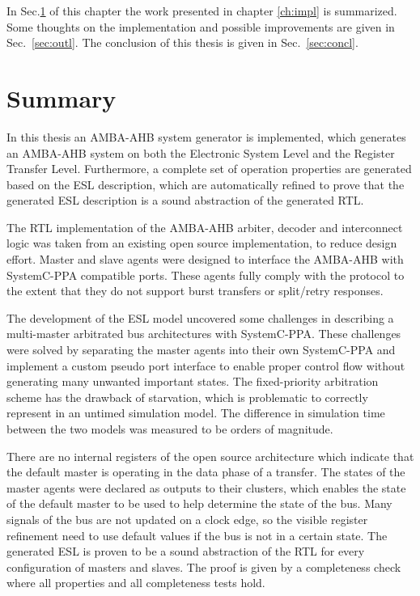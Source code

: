 In Sec.\ref{sec:sum} of this chapter the work presented in chapter \ref{ch:impl} is summarized. Some thoughts on the implementation and possible improvements are given in Sec.~\ref{sec:outl}. The conclusion of this thesis is given in Sec.~\ref{sec:concl}.

\section{Summary}
\label{sec:sum}
In this thesis an AMBA-AHB system generator is implemented, which generates an AMBA-AHB system on both the Electronic System Level and the Register Transfer Level. Furthermore, a complete set of operation properties are generated based on the ESL description, which are automatically refined to prove that the generated ESL description is a sound abstraction of the generated RTL. \par
The RTL implementation of the AMBA-AHB arbiter, decoder and interconnect logic was taken from an existing open source implementation, to reduce design effort. Master and slave agents were designed to interface the AMBA-AHB with SystemC-PPA compatible ports. These agents fully comply with the protocol to the extent that they do not support burst transfers or split/retry responses. \par
The development of the ESL model uncovered some challenges in describing a multi-master arbitrated bus architectures with SystemC-PPA. These challenges were solved by separating the master agents into their own SystemC-PPA and implement a custom pseudo port interface to enable proper control flow without generating many unwanted important states. The fixed-priority arbitration scheme has the drawback of starvation, which is problematic to correctly represent in an untimed simulation model. The difference in simulation time between the two models was measured to be orders of magnitude. \par
There are no internal registers of the open source architecture which indicate that the default master is operating in the data phase of a transfer. The states of the master agents were declared as outputs to their clusters, which enables the state of the default master to be used to help determine the state of the bus. Many signals of the bus are not updated on a clock edge, so the visible register refinement need to use default values if the bus is not in a certain state. The generated ESL is proven to be a sound abstraction of the RTL for every configuration of masters and slaves. The proof is given by a completeness check where all properties and all completeness tests hold.  
 

